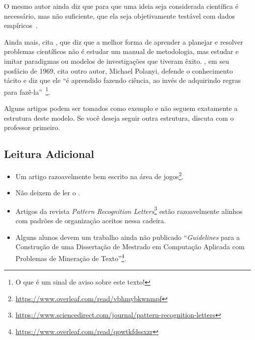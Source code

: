 O mesmo autor ainda diz que para que uma ideia seja considerada científica é necessário, mas não suficiente, que ela seja objetivamente testável com dados empíricos~\citep[p. 37]{Bunge2002}. 

Ainda mais, \citet[p. 40]{Bunge2002} cita \citet{Kuhn1970}, que diz que a melhor forma de aprender a planejar e resolver problemas científicos não é estudar um manual de metodologia, mas estudar e imitar paradigmas ou modelos de investigações que tiveram êxito. \citet{Kuhn2018}, em seu posfácio de 1969, cita outro autor, Michael Polanyi,  defende o conhecimento tácito e diz que ele ``é aprendido fazendo ciência, ao invés de adquirindo regras para fazê-la''~\citep[p. 160]{Kuhn2018}\footnote{O que é um sinal de aviso sobre este texto!}.


Alguns artigos podem ser tomados como exemplo e não seguem exatamente a estrutura deste modelo. Se você deseja seguir outra estrutura, discuta com o professor primeiro.

\subsection{Leitura Adicional}

\begin{itemize}
    \item Um artigo razoavelmente bem escrito na área de jogos\footnote{\url{https://www.overleaf.com/read/vbhmybkwnmpf}}.
    \item Não deixem de ler o .
    \item Artigos da revista \textit{Pattern Recognition Letters}\footnote{\url{https://www.sciencedirect.com/journal/pattern-recognition-letters}} estão razoavelmente alinhos com padrões de organização aceitos nessa cadeira.
    \item Alguns alunos devem um trabalho  ainda não publicado ``\textit{Guidelines} para a Construção de uma Dissertação de Mestrado em Computação Aplicada com Problemas de  Mineração de Texto''\footnote{\url{https://www.overleaf.com/read/qpwtkfdssxzr}}.
\end{itemize}

